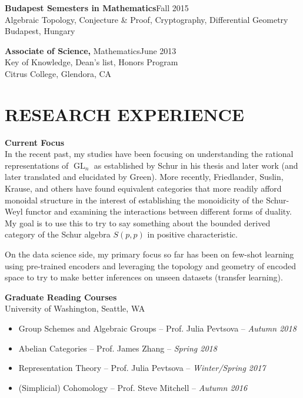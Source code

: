 \documentclass[margin]{res} %
\begin{document}
\begin{resume}
{\bf Budapest Semesters in Mathematics}\hfill Fall 2015 \\
Algebraic Topology, Conjecture \& Proof, Cryptography, Differential Geometry  \\
Budapest, Hungary 

{\bf Associate of Science,} Mathematics\hfill June 2013\\
Key of Knowledge, Dean's list, Honors Program \\
Citrus College, Glendora, CA 
 

\section{RESEARCH EXPERIENCE}

{\bf Current Focus}\\
In the recent past, my studies have been focusing on understanding the rational representations of $\operatorname{GL}_n$ as established by Schur in his thesis 
and later work (and later translated and elucidated by Green). More recently, Friedlander, Suslin, Krause,
and others have found equivalent categories that more readily afford monoidal structure in the interest of establishing the monoidicity 
of the Schur-Weyl functor and examining the interactions between different forms of duality. My goal is to use this
to try to say something about the bounded derived category of the Schur algebra $S(p,p)$ in positive characteristic.

On the data science side, my primary focus so far has been on few-shot learning using pre-trained encoders 
and leveraging the topology and geometry of encoded space to try to make better inferences on unseen datasets (transfer learning).

{\bf Graduate Reading Courses} \\
University of Washington, Seattle, WA
\begin{itemize} \itemsep -1pt %
	\item Group Schemes and Algebraic Groups -- Prof. Julia Pevtsova -- {\sl Autumn 2018}
	\item Abelian Categories -- Prof. James Zhang -- {\sl Spring 2018}
	\item Representation Theory -- Prof. Julia Pevtsova -- {\sl Winter/Spring 2017}
	\item (Simplicial) Cohomology -- Prof. Steve Mitchell -- {\sl Autumn 2016}
\end{itemize}


\end{resume}
\end{document}
